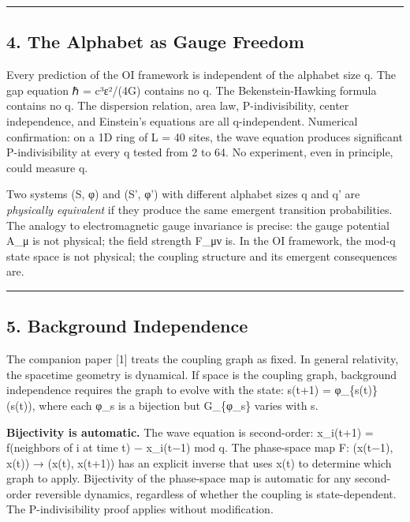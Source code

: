 \documentclass[
  11pt,
]{article}
\begin{document}
\begin{center}\rule{0.5\linewidth}{0.5pt}\end{center}

\hypertarget{the-alphabet-as-gauge-freedom}{%
\subsection{4. The Alphabet as Gauge
Freedom}\label{the-alphabet-as-gauge-freedom}}

Every prediction of the OI framework is independent of the alphabet size
q. The gap equation ℏ = c³ε²/(4G) contains no q. The Bekenstein-Hawking
formula contains no q. The dispersion relation, area law,
P-indivisibility, center independence, and Einstein's equations are all
q-independent. Numerical confirmation: on a 1D ring of L = 40 sites, the
wave equation produces significant P-indivisibility at every q tested
from 2 to 64. No experiment, even in principle, could measure q.

Two systems (S, φ) and (S', φ') with different alphabet sizes q and q'
are \emph{physically equivalent} if they produce the same emergent
transition probabilities. The analogy to electromagnetic gauge
invariance is precise: the gauge potential A\_μ is not physical; the
field strength F\_μν is. In the OI framework, the mod-q state space is
not physical; the coupling structure and its emergent consequences are.

\begin{center}\rule{0.5\linewidth}{0.5pt}\end{center}

\hypertarget{background-independence}{%
\subsection{5. Background Independence}\label{background-independence}}

The companion paper {[}1{]} treats the coupling graph as fixed. In
general relativity, the spacetime geometry is dynamical. If space is the
coupling graph, background independence requires the graph to evolve
with the state: s(t+1) = φ\_\{s(t)\}(s(t)), where each φ\_s is a
bijection but G\_\{φ\_s\} varies with s.

\textbf{Bijectivity is automatic.} The wave equation is second-order:
x\_i(t+1) = f(neighbors of i at time t) − x\_i(t−1) mod q. The
phase-space map F: (x(t−1), x(t)) → (x(t), x(t+1)) has an explicit
inverse that uses x(t) to determine which graph to apply. Bijectivity of
the phase-space map is automatic for any second-order reversible
dynamics, regardless of whether the coupling is state-dependent. The
P-indivisibility proof applies without modification.
\end{document}

